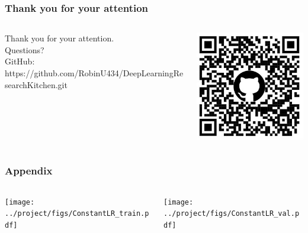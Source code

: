\documentclass[10pt,aspectratio=169]{beamer}
\begin{document}
    \begin{frame}
        \frametitle{Thank you for your attention}
        \begin{columns}
            \begin{column}{0.7\textwidth}
                {\Huge Thank you for your attention.} \\
                \vspace{1cm}
                {\huge Questions?} \\
                \vspace{1cm}
                GitHub: https://github.com/RobinU434/DeepLearningResearchKitchen.git
            \end{column}
            \begin{column}{0.3\textwidth}
                \begin{center}
                    \includegraphics[width=\textwidth]{graphics/Repo_code.jpg}
                \end{center}
            \end{column}
        \end{columns}
    \end{frame}

    \blackslide

    \begin{frame}
        \frametitle{Appendix}
        \begin{columns}
            \begin{column}{0.5\textwidth}
                \texttt{[image: ../project/figs/ConstantLR\_train.pdf]}
            \end{column}
            \begin{column}{0.5\textwidth}
                \texttt{[image: ../project/figs/ConstantLR\_val.pdf]}
            \end{column}
        \end{columns}
    
    \end{frame}
\end{document}
